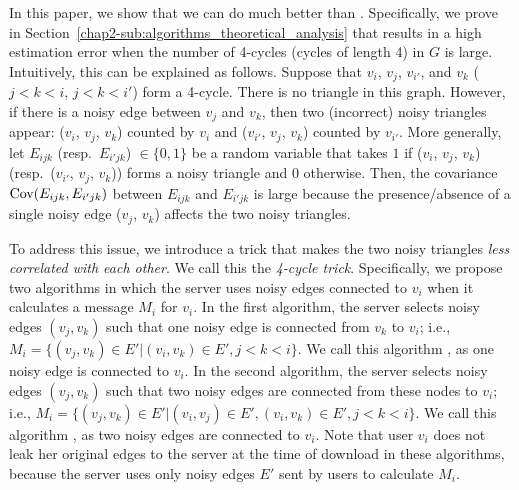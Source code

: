 In this paper,
we show that we can do much better
than \AlgOne{}.
Specifically, we prove in Section~\ref{chap2-sub:algorithms_theoretical_analysis} that \AlgOne{} results in a high estimation error when the number of 4-cycles (cycles of length 4) in $G$ is large.
Intuitively, this can be explained as follows.
Suppose that $v_i$, $v_j$, $v_{i'}$, and $v_k$
($j<k<i$, $j<k<i'$)
form a 4-cycle. 
There is no triangle in this graph.
However, if there is a noisy edge between $v_j$ and $v_k$, then two (incorrect) noisy triangles appear: ($v_i$, $v_j$, $v_k$) counted by $v_i$ and ($v_{i'}$, $v_j$, $v_k$) counted by $v_{i'}$.
More generally, let $E_{ijk}$ (resp.~$E_{i'jk}$) $\in \{0,1\}$ be a random variable that takes $1$ if ($v_i$, $v_j$, $v_k$) (resp.~($v_{i'}$, $v_j$, $v_k$)) forms a noisy triangle and $0$ otherwise.
Then, the covariance $\operatorname{\text{Cov}}(E_{ijk},E_{i'jk})$ between $E_{ijk}$ and $E_{i'jk}$ is large because the presence/absence of a single noisy edge ($v_j$, $v_k$) affects the two noisy triangles.

To address this issue, we introduce a
trick 
that makes the two noisy triangles \textit{less correlated with each other}.
We call this the \textit{4-cycle trick}.
Specifically,
we propose two algorithms in which
the server uses noisy edges connected to $v_i$ when it calculates a message $M_i$ for $v_i$.
In the first algorithm,
the server selects
noisy edges $(v_j, v_k)$ such that
one noisy edge is connected from $v_k$ to $v_i$;
i.e.,
$M_i = \{(v_j, v_k) \in E' | (v_i, v_k) \in E', j<k<i\}$.
We call this algorithm \AlgTwo{}, as one noisy edge is connected to $v_i$.
In the second algorithm,
the server selects
noisy edges $(v_j, v_k)$ such that
two noisy edges are connected from these nodes to $v_i$; i.e.,
$M_i = \{(v_j, v_k) \in E' | (v_i, v_j) \in E', (v_i, v_k) \in E', j<k<i\}$.
We call this algorithm \AlgThree{}, as two noisy edges are connected to $v_i$.
Note that user $v_i$ does not leak her original edges to the server at the time of download in these algorithms, because
the server uses only noisy edges $E'$ sent by users to calculate $M_i$.

